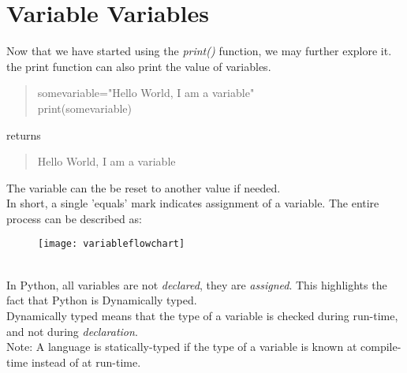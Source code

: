 \section{Variable Variables}
Now that we have started using the \emph{print()} function, we may further explore it.\\
the print function can also print the value of variables.
\begin{quote}
somevariable="Hello World, I am a variable"\\
print(somevariable)
\end{quote}
returns
\begin{quote}
Hello World, I am a variable
\end{quote}
The variable can the be reset to another value if needed.\\ In short, a single 'equals' mark indicates assignment of a variable.
The entire process can be described as: 
\begin{figure}[h]
\texttt{[image: variableflowchart]}
\end{figure}
\\
In Python, all variables are not \emph{declared}, they are \emph{assigned}. This highlights the fact that Python is Dynamically typed.\\ Dynamically typed means that the type of a variable is checked during run-time, and not during \emph{declaration}. \\ Note: A language is statically-typed if the type of a variable is known at compile-time instead of at run-time.

